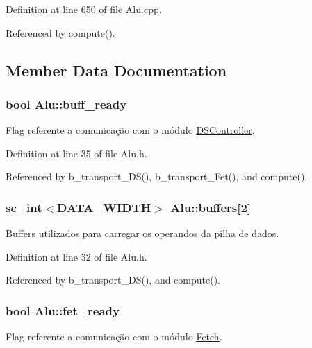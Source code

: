 Definition at line 650 of file Alu.\+cpp.



Referenced by compute().



\subsection{Member Data Documentation}
\hypertarget{classAlu_a1c88ff53601c03f366122cf4453aa5e1}{
\subsubsection[{buff\+\_\+ready}]{\setlength{\rightskip}{0pt plus 5cm}bool Alu\+::buff\+\_\+ready\hspace{0.3cm}{\ttfamily [private]}}}\label{classAlu_a1c88ff53601c03f366122cf4453aa5e1}
Flag referente a comunicação com o módulo \hyperlink{classDSController}{D\+S\+Controller}. 

Definition at line 35 of file Alu.\+h.



Referenced by b\+\_\+transport\+\_\+\+D\+S(), b\+\_\+transport\+\_\+\+Fet(), and compute().

\hypertarget{classAlu_a8d428b7be5ea14fd949309ee063bfb7b}{
\subsubsection[{buffers}]{\setlength{\rightskip}{0pt plus 5cm}sc\+\_\+int$<${\bf D\+A\+T\+A\+\_\+\+W\+I\+D\+T\+H}$>$ Alu\+::buffers\mbox{[}2\mbox{]}\hspace{0.3cm}{\ttfamily [private]}}}\label{classAlu_a8d428b7be5ea14fd949309ee063bfb7b}
Buffers utilizados para carregar os operandos da pilha de dados. 

Definition at line 32 of file Alu.\+h.



Referenced by b\+\_\+transport\+\_\+\+D\+S(), and compute().

\hypertarget{classAlu_aafc4ed2bb4d0ef6cd18a4cce9723baee}{
\subsubsection[{fet\+\_\+ready}]{\setlength{\rightskip}{0pt plus 5cm}bool Alu\+::fet\+\_\+ready\hspace{0.3cm}{\ttfamily [private]}}}\label{classAlu_aafc4ed2bb4d0ef6cd18a4cce9723baee}
Flag referente a comunicação com o módulo \hyperlink{classFetch}{Fetch}. 


